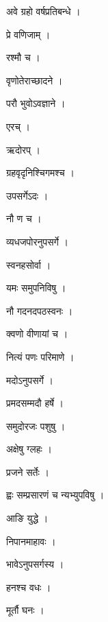 \documentclass[10pt, openany]{book}
\begin{document}
\noindent अवे ग्रहो वर्षप्रतिबन्धे ।

\noindent प्रे वणिजाम् ।

\noindent रश्मौ च ।

\noindent वृणोतेराच्छादने ।

\noindent परौ भुवोऽवज्ञाने ।

\noindent एरच् ।

\noindent ऋदोरप् ।

\noindent ग्रहवृदृनिश्चिगमश्च ।

\noindent उपसर्गेऽदः ।

\noindent नौ ण च ।

\noindent व्यधजपोरनुपसर्गे ।

\noindent स्वनहसोर्वा ।

\noindent यमः समुपनिविषु ।

\noindent नौ गदनदपठस्वनः ।

\noindent क्वणो वीणायां च ।

\noindent नित्यं पणः परिमाणे ।

\noindent मदोऽनुपसर्गे ।

\noindent प्रमदसम्मदौ हर्षे ।

\noindent समुदोरजः पशुषु ।

\noindent अक्षेषु ग्लहः ।

\noindent प्रजने सर्तेः ।

\noindent ह्वः सम्प्रसारणं च न्यभ्युपविषु ।

\noindent आङि युद्धे ।

\noindent निपानमाहावः ।

\noindent भावेऽनुपसर्गस्य ।

\noindent हनश्च वधः ।

\noindent मूर्तौ घनः ।
\end{document}
